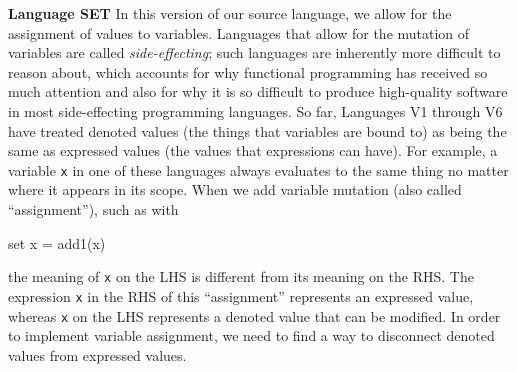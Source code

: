 \begin{minipage}[t]{\sw}
\slidenumber
\LARGE
{\bf Language SET}\exx
In this version of our source language,
we allow for the assignment of values to variables.
Languages that allow for the mutation of variables
are called {\em side-effecting}; such languages
are inherently more difficult to reason about,
which accounts for why functional programming has received
so much attention and also for why
it is so difficult to produce high-quality software
in most side-effecting programming languages.\exx
So far, Languages V1 through V6 have treated
denoted values (the things that variables are bound to)
as being the same as expressed values
(the values that expressions can have).
For example, a variable \verb'x' in one of these languages
always evaluates to the same thing no matter where it appears
in its scope.\exx
When we add variable mutation (also called ``assignment''),
such as with
\begin{qv}
set x = add1(x)
\end{qv}
the meaning of \verb'x' on the LHS is different
from its meaning on the RHS.
The expression \verb'x' in the RHS of this ``assignment''
represents an expressed value,
whereas \verb'x' on the LHS
represents a denoted value that can be modified.
In order to implement variable assignment,
we need to find a way
to disconnect denoted values from expressed values.
\end{minipage}
\clearpage
